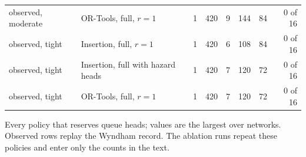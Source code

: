 \begin{table}[!htbp]
\begin{tabular}{llrrrrrr}
observed, moderate & OR-Tools, full, $r = 1$ & 1 & 420 & 9 & 144 & 84 & 0 of 16 \\
observed, tight & Insertion, full, $r = 1$ & 1 & 420 & 6 & 108 & 84 & 0 of 16 \\
observed, tight & Insertion, full with hazard heads & 1 & 420 & 7 & 120 & 72 & 0 of 16 \\
observed, tight & OR-Tools, full, $r = 1$ & 1 & 420 & 7 & 120 & 72 & 0 of 16 \\
\bottomrule
\end{tabular}
\par\smallskip\footnotesize Every policy that reserves queue heads; values are the largest over networks. Observed rows replay the Wyndham record. The ablation runs repeat these policies and enter only the counts in the text.
\end{table}
